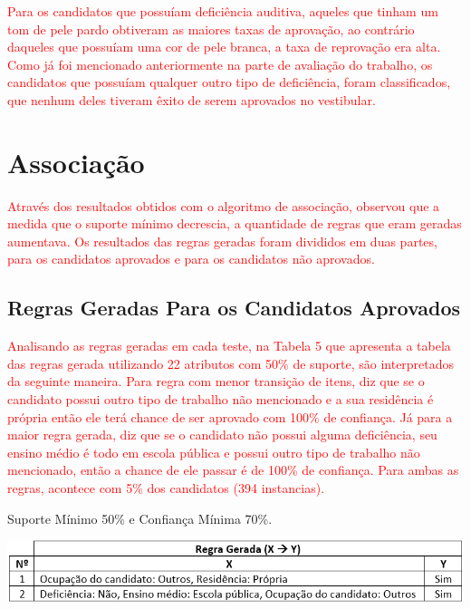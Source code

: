 \par
\textcolor{red}{Para os candidatos que possuíam deficiência auditiva, aqueles que tinham um tom de pele pardo obtiveram as maiores taxas de aprovação, ao contrário daqueles que possuíam uma cor de pele branca, a taxa de reprovação era alta. Como já foi mencionado anteriormente na parte de avaliação do trabalho, os candidatos que possuíam qualquer outro tipo de deficiência, foram classificados, que nenhum deles tiveram êxito de serem aprovados no vestibular.}


\section{Associação}

\textcolor{red}{Através dos resultados obtidos com o algoritmo de associação, observou que a medida que o suporte mínimo decrescia, a quantidade de regras que eram geradas aumentava. Os resultados das regras geradas foram divididos em duas partes, para os candidatos aprovados e para os candidatos não aprovados.}



\subsection{Regras Geradas Para os Candidatos Aprovados}

\par
\textcolor{red}{Analisando as regras geradas em cada teste, na Tabela 5 que apresenta a tabela das regras gerada utilizando 22 atributos com 50\% de suporte, são interpretados da seguinte maneira. Para regra com menor transição de itens, diz que se o candidato possui outro tipo de trabalho não mencionado e a sua residência é própria então ele terá chance de ser aprovado com 100\% de confiança. Já para a maior regra gerada, diz que se o candidato não possui alguma deficiência, seu ensino médio é todo em escola pública e possui outro tipo de trabalho não mencionado, então a chance de ele passar é de 100\% de confiança. Para ambas as regras, acontece com 5\% dos candidatos (394 instancias).}


\par
\begin{table}[!htp]
	\begin{center}
    \caption{\label{fig:waveform_fig} Suporte Mínimo 50\% e Confiança Mínima 70\%.}
	\includegraphics[scale=0.75]{Figuras/Suporte_50_atributos_22.png}
	\end{center}
\end{table}

